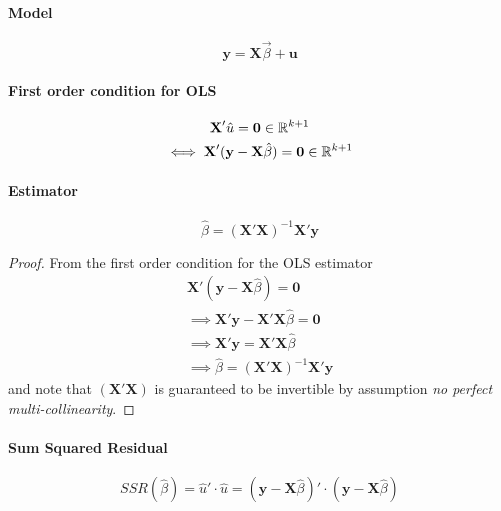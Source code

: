 \documentclass[]{article}
\begin{document}
    		\paragraph{Model}
    			\[
    				\textbf{y} = \textbf{X} \vec{\beta} + \textbf{u}
    			\]
    		\paragraph{First order condition for OLS}
    			\begin{gather*}
    				\textbf{X}' \hat{u} = \textbf{0} \in \mathbb{R}^{k+1} \\
    				\iff \textbf{X}' (\textbf{y} - \textbf{X} \hat{\beta}) = \textbf{0} \in \mathbb{R}^{k+1}
    			\end{gather*}
    		\paragraph{Estimator}	
    			\[
    				\hat{\beta} = (\textbf{X}' \textbf{X})^{-1} \textbf{X}' \textbf{y}
    			\]
    			\begin{proof}
    				From the first order condition for the OLS estimator
    				\begin{gather*}
    					\textbf{X}' (\textbf{y} - \textbf{X} \hat{\beta}) = \textbf{0} \\
    					\implies \textbf{X}' \textbf{y} - \textbf{X}' \textbf{X} \hat{\beta} = \textbf{0} \\
    					\implies \textbf{X}' \textbf{y} = \textbf{X}' \textbf{X} \hat{\beta} \\
    					\implies \hat{\beta} = (\textbf{X}' \textbf{X})^{-1} \textbf{X}' \textbf{y}
    				\end{gather*}
    				and note that $(\textbf{X}' \textbf{X})$ is guaranteed to be invertible by assumption \emph{no perfect multi-collinearity}.
    			\end{proof}
    		\paragraph{Sum Squared Residual}
    		\[
    			SSR(\hat{\beta}) = \hat{u}' \cdot \hat{u} = (\textbf{y} - \textbf{X} \hat{\beta})' \cdot (\textbf{y} - \textbf{X} \hat{\beta})
    		\]
    		
\end{document}

